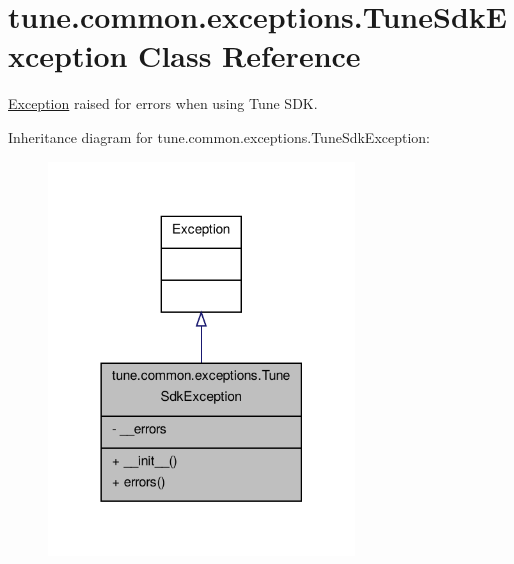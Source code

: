 \hypertarget{classtune_1_1common_1_1exceptions_1_1TuneSdkException}{\section{tune.\-common.\-exceptions.\-Tune\-Sdk\-Exception Class Reference}
\label{classtune_1_1common_1_1exceptions_1_1TuneSdkException}
}


\hyperlink{classException}{Exception} raised for errors when using Tune S\-D\-K.  




Inheritance diagram for tune.\-common.\-exceptions.\-Tune\-Sdk\-Exception\-:
\nopagebreak
\begin{figure}[H]
\begin{center}
\leavevmode
\includegraphics[width=230pt]{classtune_1_1common_1_1exceptions_1_1TuneSdkException__inherit__graph}
\end{center}
\end{figure}


